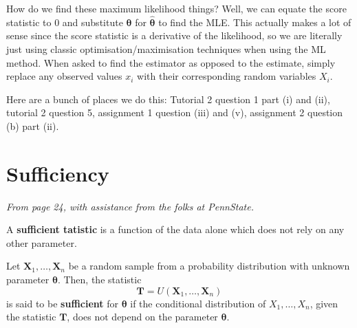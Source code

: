 How do we find these maximum likelihood things? 
Well, we can equate the score statistic to \(0\) and substitute \(\bm{\theta}\) for \(\hat{\bm{\theta}}\) to find the MLE\@. 
This actually makes a lot of sense since the score statistic is a derivative of the likelihood, so we are literally just using classic optimisation/maximisation techniques when using the ML method. 
When asked to find the estimator as opposed to the estimate, simply replace any observed values \(x_i\) with their corresponding random variables \(X_i\).

\begin{exercise}
    Here are a bunch of places we do this: Tutorial 2 question 1 part (i) and (ii), tutorial 2 question 5, assignment 1 question (iii) and (v), assignment 2 question (b) part (ii).
\end{exercise}

\section{Sufficiency}\label{sec:sufficiency}

\textit{From page 24, with assistance from the folks at PennState\autocite{penn415}.}

A \textbf{sufficient tatistic} is a function of the data alone which does not rely on any other parameter. 


\begin{definition}[Sufficient]\label{defn:sufficient}
    Let \(\bm{X}_1,\ldots,\bm{X}_n\) be a random sample from a probability distribution with unknown parameter \(\bm{\theta}\). 
    Then, the statistic
    \[\bm{T} = U(\bm{X}_1,\ldots,\bm{X}_n)\]
    is said to be \textbf{sufficient} for \(\bm{\theta}\) if the conditional distribution of \(X_1,\ldots,X_n\), 
    given the statistic \(\bm{T}\), does not depend on the parameter \(\bm{\theta}\). 
\end{definition}

